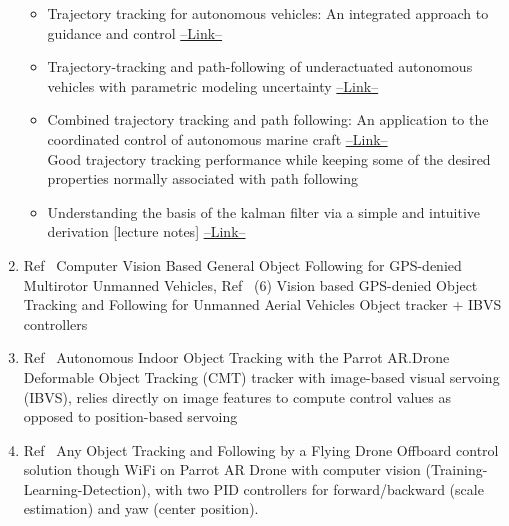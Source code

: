 \begin{enumerate}
\begin{itemize}
\item Trajectory tracking for autonomous vehicles: An integrated approach to guidance and control \href{https://www.scopus.com/record/display.uri?eid=2-s2.0-0031673631&origin=reflist}{--Link--} \\

\item Trajectory-tracking and path-following of underactuated autonomous vehicles with parametric modeling uncertainty \href{https://www.scopus.com/record/display.uri?eid=2-s2.0-34548237452&origin=reflist}{--Link--} \\

\item Combined trajectory tracking and path following: An application to the coordinated control of autonomous marine craft \href{https://www.scopus.com/record/display.uri?eid=2-s2.0-0035713115&origin=reflist}{--Link--} \\ 
Good trajectory tracking performance while keeping some of the desired properties normally associated with path following

\item Understanding the basis of the kalman filter via a simple and intuitive derivation [lecture notes] \href{https://www.scopus.com/record/display.uri?eid=2-s2.0-85032780920&origin=reflist}{--Link--} \\
\end{itemize}

\item Ref~\cite{Pestana20141886} Computer Vision Based General Object Following for GPS-denied Multirotor Unmanned Vehicles, Ref~\cite{Pestana2013} (6) Vision based GPS-denied Object Tracking and Following for Unmanned Aerial Vehicles
Object tracker + IBVS controllers

\item Ref~\cite{Chakrabarty201625} Autonomous Indoor Object Tracking with the Parrot AR.Drone
Deformable Object
Tracking (CMT) tracker with image-based visual servoing (IBVS), relies directly on image features to compute control values as opposed to position-based servoing

\item Ref~\cite{Bartak201635} Any Object Tracking and Following by a Flying Drone
 Offboard control solution though WiFi on Parrot AR Drone with computer vision (Training-Learning-Detection), with two PID controllers for forward/backward (scale estimation) and yaw (center position).

\end{enumerate}
\newpage